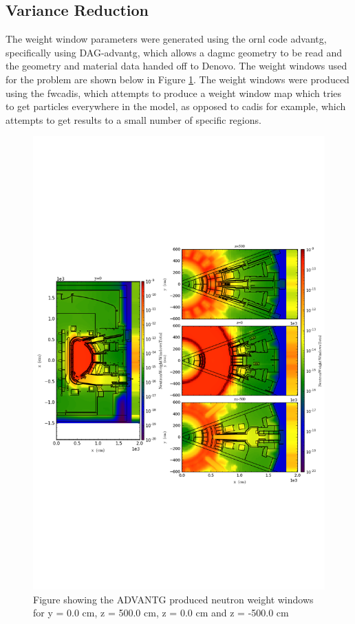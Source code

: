 \documentclass[12pt]{article}
\begin{document}
\subsection{Variance Reduction}
The weight window parameters were generated using the \gls{ornl} code
\gls{advantg}, specifically using DAG-\gls{advantg}, which allows a
\gls{dagmc} geometry to be read and the geometry and material data handed off to
Denovo. The weight windows used for the problem are shown below in Figure
\ref{fig:wwinp}. The weight windows were produced using the \gls{fwcadis},
which attempts to produce a weight window map which tries to get particles
everywhere in the model, as opposed to \gls{cadis} for example, which
attempts to get results to a small number of specific regions.
\begin{figure}[ht!]
  \centering
  \includegraphics[trim={0cm 9cm 0cm 10cm},clip,scale=0.75]{../plots/wwinp/Neutron_Weight_Windows.png}
  \caption{Figure showing the ADVANTG produced neutron weight windows for y = 0.0 cm,
  z = 500.0 cm, z = 0.0 cm and z = -500.0 cm}
  \label{fig:wwinp}
\end{figure}
\end{document}
